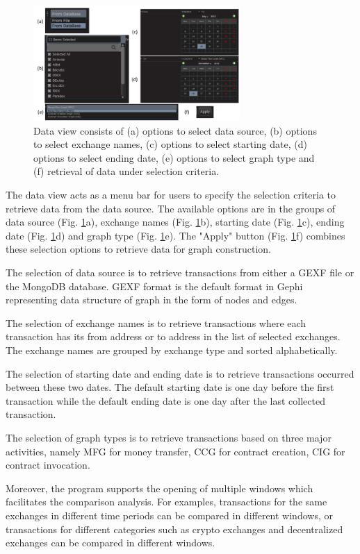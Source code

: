 \begin{figure}[htb]
\includegraphics[width=0.7\textwidth]{gfx/data-view.png}
\caption{Data view consists of (a) options to select data source, (b) options to select exchange names, (c) options to select starting date, (d) options to select ending date, (e) options to select graph type and (f) retrieval of data under selection criteria.}
\label{fig:data-view}
\end{figure}

The data view acts as a menu bar for users to specify the selection criteria to retrieve data from the data source. The available options are in the groups of data source (Fig. \ref{fig:data-view}a), exchange names (Fig. \ref{fig:data-view}b), starting date (Fig. \ref{fig:data-view}c), ending date (Fig. \ref{fig:data-view}d) and graph type (Fig. \ref{fig:data-view}e). The "Apply" button (Fig. \ref{fig:data-view}f) combines these selection options to retrieve data for graph construction.

The selection of data source is to retrieve transactions from either a GEXF file or the MongoDB database. GEXF format is the default format in Gephi representing data structure of graph in the form of nodes and edges.

The selection of exchange names is to retrieve transactions where each transaction has its from address or to address in the list of selected exchanges. The exchange names are grouped by exchange type and sorted alphabetically.

The selection of starting date and ending date is to retrieve transactions occurred between these two dates. The default starting date is one day before the first transaction while the default ending date is one day after the last collected transaction.

The selection of graph types is to retrieve transactions based on three major activities, namely MFG for money transfer, CCG for contract creation, CIG for contract invocation.

Moreover, the program supports the opening of multiple windows which facilitates the comparison analysis. For examples, transactions for the same exchanges in different time periods can be compared in different windows, or transactions for different categories such as crypto exchanges and decentralized exchanges can be compared in different windows.

